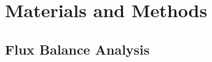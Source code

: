 \documentclass[12pt]{article}
\begin{document}





\section*{Materials and Methods}

\subsection*{Flux Balance Analysis} 
\end{document}
